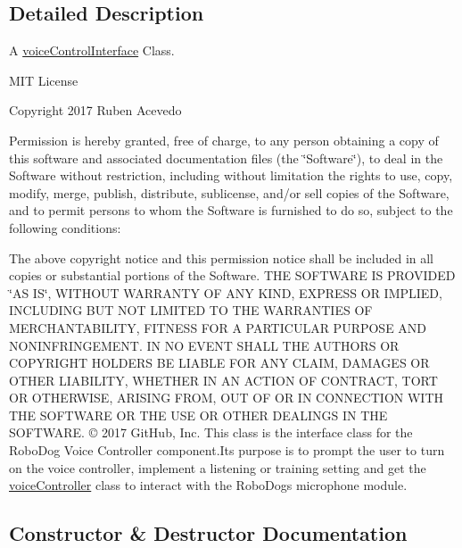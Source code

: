 \subsection{Detailed Description}
A \hyperlink{classvoiceControlInterface}{voice\+Control\+Interface} Class. 

M\+IT License

Copyright 2017 Ruben Acevedo

Permission is hereby granted, free of charge, to any person obtaining a copy of this software and associated documentation files (the \char`\"{}\+Software\char`\"{}), to deal in the Software without restriction, including without limitation the rights to use, copy, modify, merge, publish, distribute, sublicense, and/or sell copies of the Software, and to permit persons to whom the Software is furnished to do so, subject to the following conditions\+:

The above copyright notice and this permission notice shall be included in all copies or substantial portions of the Software. T\+HE S\+O\+F\+T\+W\+A\+RE IS P\+R\+O\+V\+I\+D\+ED \char`\"{}\+A\+S I\+S\char`\"{}, W\+I\+T\+H\+O\+UT W\+A\+R\+R\+A\+N\+TY OF A\+NY K\+I\+ND, E\+X\+P\+R\+E\+SS OR I\+M\+P\+L\+I\+ED, I\+N\+C\+L\+U\+D\+I\+NG B\+UT N\+OT L\+I\+M\+I\+T\+ED TO T\+HE W\+A\+R\+R\+A\+N\+T\+I\+ES OF M\+E\+R\+C\+H\+A\+N\+T\+A\+B\+I\+L\+I\+TY, F\+I\+T\+N\+E\+SS F\+OR A P\+A\+R\+T\+I\+C\+U\+L\+AR P\+U\+R\+P\+O\+SE A\+ND N\+O\+N\+I\+N\+F\+R\+I\+N\+G\+E\+M\+E\+NT. IN NO E\+V\+E\+NT S\+H\+A\+LL T\+HE A\+U\+T\+H\+O\+RS OR C\+O\+P\+Y\+R\+I\+G\+HT H\+O\+L\+D\+E\+RS BE L\+I\+A\+B\+LE F\+OR A\+NY C\+L\+A\+IM, D\+A\+M\+A\+G\+ES OR O\+T\+H\+ER L\+I\+A\+B\+I\+L\+I\+TY, W\+H\+E\+T\+H\+ER IN AN A\+C\+T\+I\+ON OF C\+O\+N\+T\+R\+A\+CT, T\+O\+RT OR O\+T\+H\+E\+R\+W\+I\+SE, A\+R\+I\+S\+I\+NG F\+R\+OM, O\+UT OF OR IN C\+O\+N\+N\+E\+C\+T\+I\+ON W\+I\+TH T\+HE S\+O\+F\+T\+W\+A\+RE OR T\+HE U\+SE OR O\+T\+H\+ER D\+E\+A\+L\+I\+N\+GS IN T\+HE S\+O\+F\+T\+W\+A\+RE. © 2017 Git\+Hub, Inc. This class is the interface class for the Robo\+Dog Voice Controller component.\+Its purpose is to prompt the user to turn on the voice controller, implement a listening or training setting and get the \hyperlink{classvoiceController}{voice\+Controller} class to interact with the Robo\+Dog\textquotesingle{}s microphone module. 

\subsection{Constructor \& Destructor Documentation}
